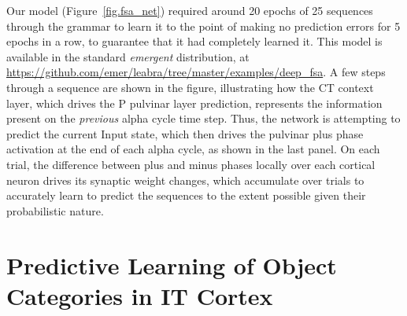 \documentclass[11pt,twoside]{article}
\newif\myifpdf
\begin{document}
Our model (Figure~\ref{fig.fsa_net}) required around 20 epochs of 25 sequences through the grammar to learn it to the point of making no prediction errors for 5 epochs in a row, to guarantee that it had completely learned it.  This model is available in the standard {\em emergent} distribution, at \url{https://github.com/emer/leabra/tree/master/examples/deep_fsa}.  A few steps through a sequence are shown in the figure, illustrating how the CT context layer, which drives the P pulvinar layer prediction, represents the information present on the {\em previous} alpha cycle time step.  Thus, the network is attempting to predict the current Input state, which then drives the pulvinar plus phase activation at the end of each alpha cycle, as shown in the last panel.  On each trial, the difference between plus and minus phases locally over each cortical neuron drives its synaptic weight changes, which accumulate over trials to accurately learn to predict the sequences to the extent possible given their probabilistic nature.

\section{Predictive Learning of Object Categories in IT Cortex}
\end{document}
